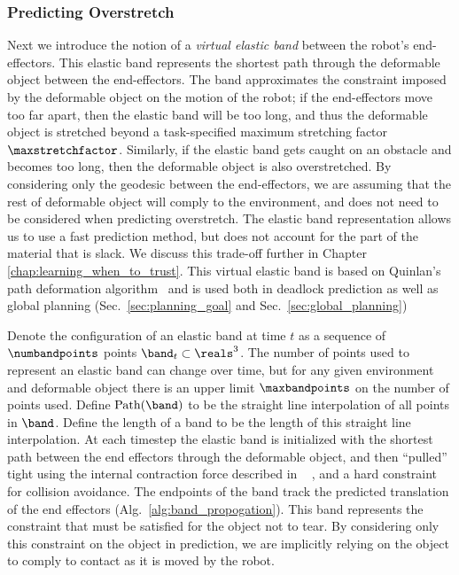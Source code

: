 \subsubsection{Predicting Overstretch}
\label{sec:overstretch}


Next we introduce the notion of a \textit{virtual elastic band} between the robot's end-effectors. This elastic band represents the shortest path through the deformable object between the end-effectors. The band approximates the constraint imposed by the deformable object on the motion of the robot; if the end-effectors move too far apart, then the elastic band will be too long, and thus the deformable object is stretched beyond a task-specified maximum stretching factor $\maxstretchfactor$. Similarly, if the elastic band gets caught on an obstacle and becomes too long, then the deformable object is also overstretched. By considering only the geodesic between the end-effectors, we are assuming that the rest of deformable object will comply to the environment, and does not need to be considered when predicting overstretch. The elastic band representation allows us to use a fast prediction method, but does not account for the part of the material that is slack. We discuss this trade-off further in Chapter \ref{chap:learning_when_to_trust}. This virtual elastic band is based on Quinlan's path deformation algorithm~\cite{Quinlan1994} and is used both in deadlock prediction as well as global planning (Sec.~\ref{sec:planning_goal} and Sec.~\ref{sec:global_planning})


Denote the configuration of an elastic band at time $t$ as a sequence of $\numbandpoints$ points $\band_t \subset \reals^3$. The number of points used to represent an elastic band can change over time, but for any given environment and deformable object there is an upper limit $\maxbandpoints$ on the number of points used. Define $\textrm{Path}(\band)$ to be the straight line interpolation of all points in $\band$. Define the length of a band to be the length of this straight line interpolation. At each timestep the elastic band is initialized with the shortest path between the end effectors through the deformable object, and then ``pulled'' tight using the internal contraction force described in ~\cite{Quinlan1994} , and a hard constraint for collision avoidance. The endpoints of the band track the predicted translation of the end effectors (Alg.~\ref{alg:band_propogation}). This band represents the constraint that must be satisfied for the object not to tear. By considering only this constraint on the object in prediction, we are implicitly relying on the object to comply to contact as it is moved by the robot. %



